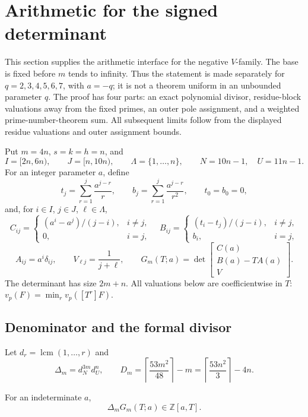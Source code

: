 \section{Arithmetic for the signed determinant}
\label{sec:v-arithmetic}

This section supplies the arithmetic interface for the negative
\(V\)-family.  The base is fixed before \(m\) tends to infinity.  Thus the
statement is made separately for \(q=2,3,4,5,6,7\), with \(a=-q\); it is
not a theorem uniform in an unbounded parameter \(q\).  The proof has four
parts: an exact polynomial divisor, residue-block valuations away from the
fixed primes, an outer pole assignment, and a weighted prime-number-theorem
sum.  All subsequent limits follow from the displayed residue valuations and
outer assignment bounds.

Put \(m=4n\), \(s=k=h=n\), and
\[
 I=[2n,6n),\qquad J=[n,10n),\qquad
 \Lambda=\{1,\ldots,n\},\qquad N=10n-1,\quad U=11n-1.
\]
For an integer parameter \(a\), define
\[
 t_j=\sum_{r=1}^{j}\frac{a^{j-r}}r,\qquad
 b_j=\sum_{r=1}^{j}\frac{a^{j-r}}{r^2},
 \qquad t_0=b_0=0,
\]
and, for \(i\in I\), \(j\in J\), \(\ell\in\Lambda\),
\[
 C_{ij}=\begin{cases}(a^i-a^j)/(j-i),&i\ne j,\\0,&i=j,\end{cases}
 \quad
 B_{ij}=\begin{cases}(t_i-t_j)/(j-i),&i\ne j,\\b_i,&i=j,\end{cases}
\]
\[
 A_{ij}=a^i\delta_{ij},\qquad V_{\ell j}=\frac1{j+\ell},\qquad
 G_m(T;a)=\det\begin{bmatrix}C(a)\\ B(a)-TA(a)\\ V\end{bmatrix}.
\]
The determinant has size \(2m+n\).  All valuations below are coefficientwise
in \(T\): \(v_p(F)=\min_r v_p([T^r]F)\).

\subsection{Denominator and the formal divisor}

Let \(d_r=\operatorname{lcm}(1,\ldots,r)\) and
\[
 \Delta_m=d_N^{3m}d_U^n,\qquad
 D_m=\left\lceil\frac{53m^2}{48}\right\rceil-m
      =\left\lceil\frac{53n^2}{3}\right\rceil-4n.
\]

\begin{lemma}[denominator]
\label{lem:v-denom}
For an indeterminate \(a\),
\[
 \Delta_mG_m(T;a)\in\mathbb Z[a,T].
 \]
\end{lemma}

